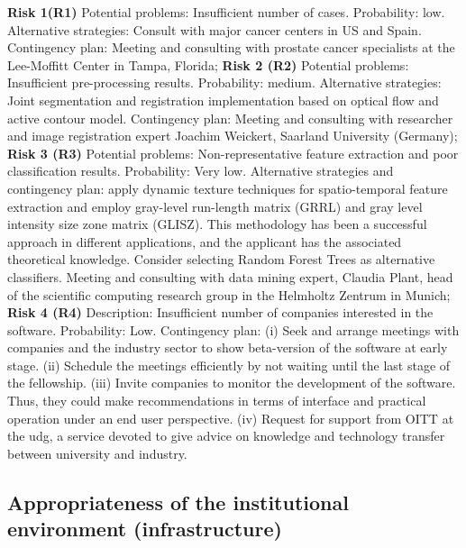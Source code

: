 \textbf{Risk 1(R1)} Potential problems: Insufficient number of cases. Probability: low. Alternative strategies:  Consult with major cancer centers in US and Spain. Contingency plan: Meeting and consulting with prostate cancer specialists at the Lee-Moffitt Center in Tampa, Florida; 
\textbf{Risk 2 (R2)} Potential problems: Insufficient pre-processing results. Probability: medium. Alternative strategies: Joint segmentation and registration implementation based on optical flow and active contour model. Contingency plan: Meeting and consulting with researcher and image registration expert Joachim Weickert, Saarland University (Germany);
\textbf{Risk 3 (R3)} Potential problems: Non-representative feature extraction and poor classification results. Probability: Very low. Alternative strategies and contingency plan: apply dynamic texture techniques for spatio-temporal feature extraction and employ gray-level run-length matrix (GRRL) and gray level intensity size zone matrix (GLISZ). 
This methodology has been a successful approach in different applications, and the applicant has the associated theoretical knowledge. 
Consider selecting Random Forest Trees as alternative classifiers. Meeting and consulting with data mining expert, Claudia Plant, head of the scientific computing research group in the Helmholtz Zentrum in Munich;
\textbf{Risk 4 (R4)} Description: Insufficient number of companies interested in the software. Probability: Low. Contingency plan: (i) Seek and arrange meetings with companies and the industry sector to show beta-version of the software at early stage. (ii) Schedule the meetings efficiently by not waiting until the last stage of the fellowship. (iii) Invite companies to monitor the development of the software. Thus, they could make recommendations in terms of interface and practical operation under an end user perspective. (iv) Request for support from OITT at the \ac{udg}, a service devoted to give advice on knowledge and technology transfer between university and industry.

\subsection{Appropriateness of the institutional environment (infrastructure)}
\label{sec:institution}

